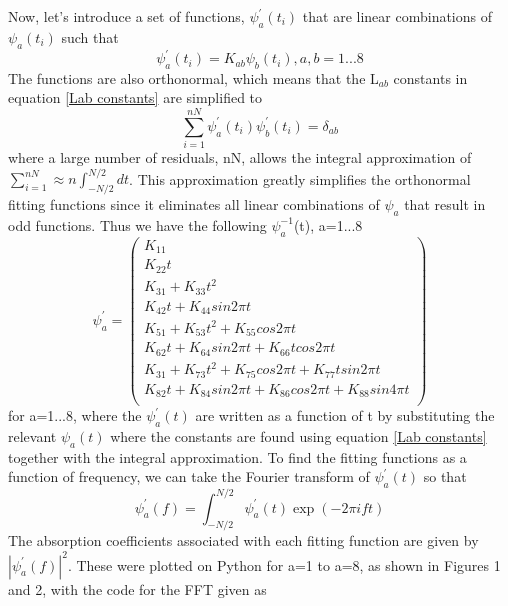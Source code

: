 \documentclass[12pt]{article}
\begin{document}
	\noindent Now, let's introduce a set of functions, $\psi_{a}^{'}(t_i)$ that are linear combinations of $\psi_a(t_i)$ such that
	\begin{equation}\label{psi'}
	\psi_{a}^{'}(t_i)=K_{ab}\psi_{b}(t_i), a,b=1...8
	\end{equation}
	The functions are also orthonormal, which means that the L$_{ab}$ constants in equation \ref{Lab constants} are simplified to
	\begin{equation}\label{psi'orthonormal}
	\sum_{i=1}^{nN}\psi_{a}^{'}(t_i)\psi_{b}^{'}(t_i)=\delta_{ab}
	\end{equation}
	where a large number of residuals, nN, allows the integral approximation of $\sum_{i=1}^{nN}\approx n\int_{-N/2}^{N/2}dt$. This approximation greatly simplifies the orthonormal fitting functions since it eliminates all linear combinations of $\psi_a$ that result in odd functions.
	Thus we have the following $\psi_{a}^{-1}$(t), a=1...8
	$$
	\psi_{a}^{'}=
	\begin{pmatrix}
	K_{11}\\
	K_{22}t\\
	K_{31}+K_{33}t^2\\
	K_{42}t+K_{44}sin2 \pi t\\
	K_{51}+K_{53}t^2+K_{55}cos2 \pi t\\
	K_{62}t+K_{64}sin2 \pi t+K_{66}t cos2 \pi t\\
	K_{31}+K_{73}t^2+K_{75}cos2 \pi t+K_{77}t sin2 \pi t\\
	K_{82}t+K_{84}sin2 \pi t+K_{86}cos2 \pi t+K_{88}sin4 \pi t\\
	\end{pmatrix}
	$$
	for a=1...8, where the $\psi_{a}^{'}(t)$ are written as a function of t by substituting the relevant $\psi_a(t)$ where the constants are found using equation \ref{Lab constants} together with the integral approximation. 
	To find the fitting functions as a function of frequency, we can take the Fourier transform of $\psi_a^{'}(t)$ so that
	\begin{equation}\label{psi(f)}
	\psi_a^{'}(f)=\int_{-N/2}^{N/2}\psi_a^{'}(t)\exp({-2\pi i f t})
	\end{equation}
	The absorption coefficients associated with each fitting function are given by $|\psi_a^{'}(f)|^2$. These were plotted on Python for a=1 to a=8, as shown in Figures 1 and 2, with the code for the FFT given as\\
	
\end{document}
